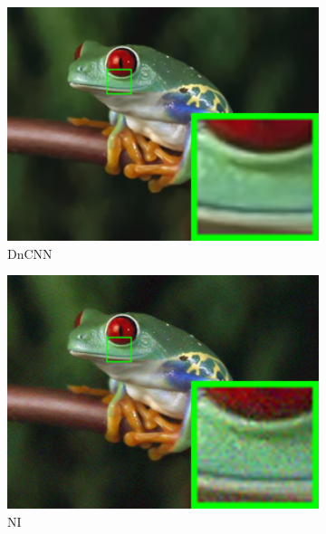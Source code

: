 \begin{figure}
\begin{subfigure}[t]{0.24\textwidth}
        \includegraphics[width=1\textwidth]{images/twsc/nc/resize_br_DnCNN_frog.png}
\caption{DnCNN}
    \end{subfigure}
\hfill
    \begin{subfigure}[t]{0.24\textwidth}
        \centering
        \includegraphics[width=1\textwidth]{images/twsc/nc/resize_br_NI_frog.png}
\caption{NI}
    \end{subfigure}
\hfill
    \begin{subfigure}[t]{0.24\textwidth}
        \centering

\end{subfigure}
\end{figure}
